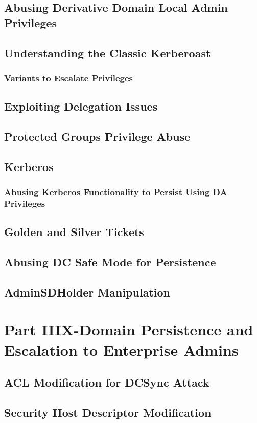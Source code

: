 \documentclass{article}
\begin{document}
\subsection{Abusing Derivative Domain Local Admin Privileges}
\subsection{Understanding the Classic Kerberoast}
\subsubsection{Variants to Escalate Privileges}
\subsection{Exploiting Delegation Issues}
\subsection{Protected Groups Privilege Abuse}
\subsection{Kerberos}
\subsubsection{Abusing Kerberos Functionality to Persist Using DA Privileges}
\subsection{Golden and Silver Tickets}
\subsection{Abusing DC Safe Mode for Persistence}
\subsection{AdminSDHolder Manipulation}
\section{Part IIIX-Domain Persistence and Escalation to Enterprise Admins}
\subsection{ACL Modification for DCSync Attack}
\subsection{Security Host Descriptor Modification}
\end{document}
